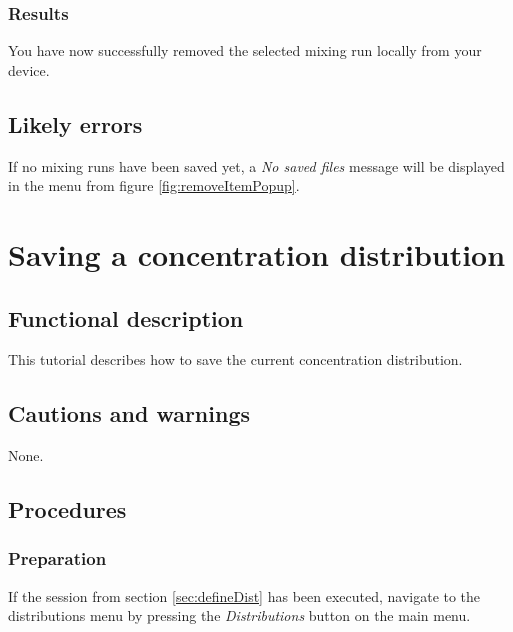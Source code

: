 \subsubsection{Results}
You have now successfully removed the selected mixing run locally from your device.

\subsection{Likely errors}
If no mixing runs have been saved yet, a \emph{No saved files} message will be displayed in the menu from figure \ref{fig:removeItemPopup}.


\section{Saving a concentration distribution}\label{sec:savdist}

\subsection{Functional description}
This tutorial describes how to save the current concentration distribution.

\subsection{Cautions and warnings}
None.

\subsection{Procedures}

\subsubsection{Preparation}
If the session from section \ref{sec:defineDist} has been executed, navigate to the distributions menu by pressing the \emph{Distributions} button on the main menu.

